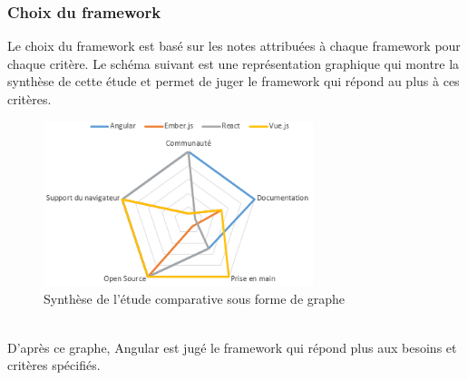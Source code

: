 \subsubsection*{Choix du framework}
Le choix du framework est basé sur les notes attribuées à chaque framework pour chaque critère. Le schéma suivant est une représentation graphique qui montre la synthèse de cette étude et permet de juger le framework qui répond au plus à ces critères.
\begin{figure}[h!]  
 \centering
    \includegraphics[width=0.7\textwidth]{chapitre3/Figures/benchFront.png}
  \caption{Synthèse de l'étude comparative sous forme de graphe}
\end{figure}
\\
D’après ce graphe, Angular est jugé le framework qui répond plus aux besoins et critères spécifiés.



